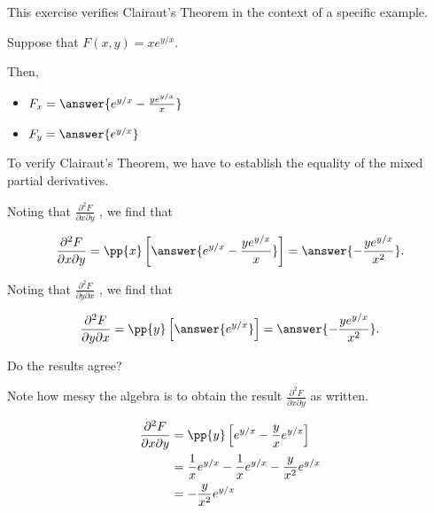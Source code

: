 \documentclass{ximera}
\author{Jim Talamo}
\newcommand{\Pp}[2]{\frac{\partial #1}{\partial #2}}
\begin{document}
\begin{exercise}
This exercise verifies Clairaut's Theorem in the context of a specific example.

Suppose that $F(x,y) = xe^{y/x}$.

Then,

\begin{itemize}
\item $F_x = \answer{e^{y/x} -\frac{ye^{y/x}}{x}}$
\item $F_y = \answer{e^{y/x}}$
\end{itemize}

To verify Clairaut's Theorem, we have to establish the equality of the mixed partial derivatives.

Noting that $\Pp{^2F}{x \partial y}$ , we find that 

\[
\Pp{^2F}{x \partial y} = \pp{x} \left[\answer{   e^{y/x} -\frac{ye^{y/x}}{x}   } \right] = \answer{-\frac{ye^{y/x}}{x^2}}.
\]

Noting that $\Pp{^2F}{y \partial x}$  , we find that 

\[
\Pp{^2F}{y \partial x}  = \pp{y} \left[\answer{e^{y/x}} \right] = \answer{-\frac{ye^{y/x}}{x^2}}.
\]

Do the results agree?
\begin{multipleChoice}
\end{multipleChoice}

\begin{feedback}[correct]
Note how messy the algebra is to obtain the result $\Pp{^2F}{x \partial y}$ as written.

\begin{align*}
\Pp{^2F}{x \partial y} & =  \pp{y} \left[   e^{y/x} -\frac{y}{x}e^{y/x} \right] \\
& =  \frac{1}{x}e^{y/x} -\frac{1}{x}e^{y/x}-\frac{y}{x^2}e^{y/x} \\
&= -\frac{y}{x^2}e^{y/x}
\end{align*}

\end{feedback}

\end{exercise}
\end{document}
